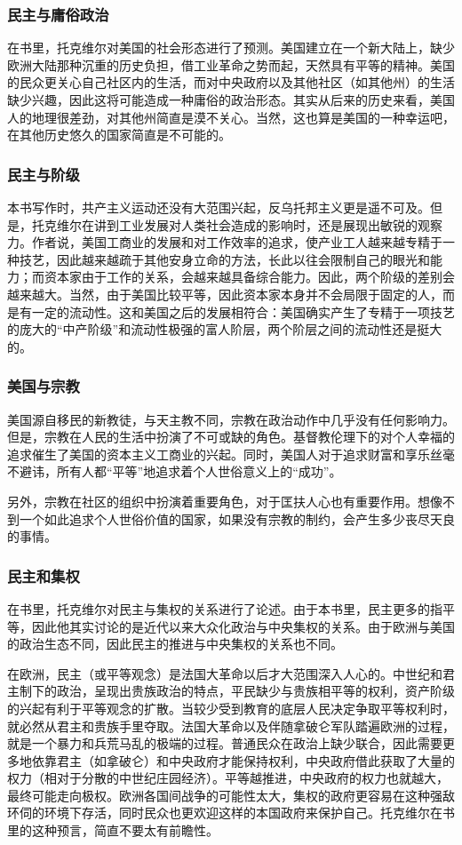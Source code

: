 \subsubsection{民主与庸俗政治}

在书里，托克维尔对美国的社会形态进行了预测。美国建立在一个新大陆上，缺少欧洲大陆那种沉重的历史负担，借工业革命之势而起，天然具有平等的精神。美国的民众更关心自己社区内的生活，而对中央政府以及其他社区（如其他州）的生活缺少兴趣，因此这将可能造成一种庸俗的政治形态。其实从后来的历史来看，美国人的地理很差劲，对其他州简直是漠不关心。当然，这也算是美国的一种幸运吧，在其他历史悠久的国家简直是不可能的。

\subsubsection{民主与阶级}
本书写作时，共产主义运动还没有大范围兴起，反乌托邦主义更是遥不可及。但是，托克维尔在讲到工业发展对人类社会造成的影响时，还是展现出敏锐的观察力。作者说，美国工商业的发展和对工作效率的追求，使产业工人越来越专精于一种技艺，因此越来越疏于其他安身立命的方法，长此以往会限制自己的眼光和能力；而资本家由于工作的关系，会越来越具备综合能力。因此，两个阶级的差别会越来越大。当然，由于美国比较平等，因此资本家本身并不会局限于固定的人，而是有一定的流动性。这和美国之后的发展相符合：美国确实产生了专精于一项技艺的庞大的“中产阶级”和流动性极强的富人阶层，两个阶层之间的流动性还是挺大的。

\subsubsection{美国与宗教}
美国源自移民的新教徒，与天主教不同，宗教在政治动作中几乎没有任何影响力。但是，宗教在人民的生活中扮演了不可或缺的角色。基督教伦理下的对个人幸福的追求催生了美国的资本主义工商业的兴起。同时，美国人对于追求财富和享乐丝毫不避讳，所有人都“平等”地追求着个人世俗意义上的“成功”。

另外，宗教在社区的组织中扮演着重要角色，对于匡扶人心也有重要作用。想像不到一个如此追求个人世俗价值的国家，如果没有宗教的制约，会产生多少丧尽天良的事情。

\subsubsection{民主和集权}
在书里，托克维尔对民主与集权的关系进行了论述。由于本书里，民主更多的指平等，因此他其实讨论的是近代以来大众化政治与中央集权的关系。由于欧洲与美国的政治生态不同，因此民主的推进与中央集权的关系也不同。

在欧洲，民主（或平等观念）是法国大革命以后才大范围深入人心的。中世纪和君主制下的政治，呈现出贵族政治的特点，平民缺少与贵族相平等的权利，资产阶级的兴起有利于平等观念的扩散。当较少受到教育的底层人民决定争取平等权利时，就必然从君主和贵族手里夺取。法国大革命以及伴随拿破仑军队踏遍欧洲的过程，就是一个暴力和兵荒马乱的极端的过程。普通民众在政治上缺少联合，因此需要更多地依靠君主（如拿破仑）和中央政府才能保持权利，中央政府借此获取了大量的权力（相对于分散的中世纪庄园经济）。平等越推进，中央政府的权力也就越大，最终可能走向极权。欧洲各国间战争的可能性太大，集权的政府更容易在这种强敌环伺的环境下存活，同时民众也更欢迎这样的本国政府来保护自己。托克维尔在书里的这种预言，简直不要太有前瞻性。

